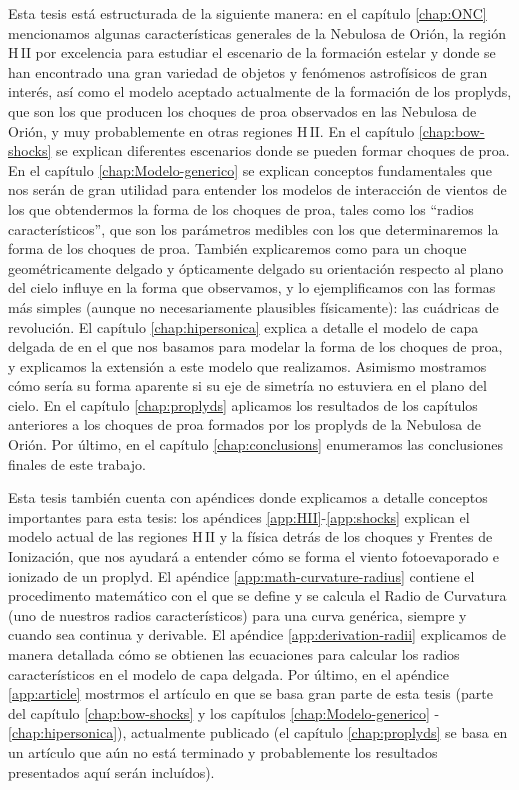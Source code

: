 \documentclass[11pt, twoside]{book}
\newcommand\Ion[2]{\ensuremath{\mathrm{#1\,\scriptstyle #2}}} %
\begin{document}
Esta tesis está estructurada de la siguiente manera: en el capítulo \ref{chap:ONC} mencionamos algunas características generales de la Nebulosa de Orión, la región \Ion{H}{II} por excelencia para estudiar el escenario de la formación estelar y donde se han encontrado una gran variedad de objetos y fenómenos astrofísicos de gran interés, así como el modelo aceptado actualmente de la formación de los proplyds, que son los que producen los choques de proa observados en las Nebulosa de Orión, y muy probablemente en otras regiones \Ion{H}{II}. En el capítulo \ref{chap:bow-shocks} se explican diferentes escenarios donde se pueden formar choques de proa. En el capítulo \ref{chap:Modelo-generico} se explican conceptos fundamentales que nos serán de gran utilidad para entender los modelos de interacción de vientos de los que obtendermos la forma de los choques de proa, tales como los ``radios característicos'', que son los parámetros medibles con los que determinaremos la forma de los choques de proa. También explicaremos como para un choque geométricamente delgado y ópticamente delgado su orientación respecto al plano del cielo influye en la forma que observamos, y lo ejemplificamos con las formas más simples (aunque no necesariamente plausibles físicamente): las cuádricas de revolución. El capítulo \ref{chap:hipersonica} explica a detalle el modelo de capa delgada de \citet{Canto:1996} en el que nos basamos para modelar la forma de los choques de proa, y explicamos la extensión a este modelo que realizamos. Asimismo mostramos cómo sería su forma aparente si su eje de simetría no estuviera en el plano del cielo. En el capítulo \ref{chap:proplyds} aplicamos los resultados de los capítulos anteriores a los choques de proa formados por los proplyds de la Nebulosa de Orión. Por último, en el capítulo \ref{chap:conclusions} enumeramos las conclusiones finales de este trabajo.

Esta tesis también cuenta con apéndices donde explicamos a detalle conceptos importantes para esta tesis: los apéndices \ref{app:HII}-\ref{app:shocks} explican el modelo actual de las regiones \Ion{H}{II} y la física detrás de los choques y Frentes de Ionización, que nos ayudará a entender cómo se forma el viento fotoevaporado e ionizado de un proplyd. El apéndice \ref{app:math-curvature-radius} contiene el procedimento matemático con el que se define y se calcula el Radio de Curvatura (uno de nuestros radios característicos) para una curva genérica, siempre y cuando sea continua y derivable. El apéndice \ref{app:derivation-radii} explicamos de manera detallada cómo se obtienen las ecuaciones para calcular los radios característicos en el modelo de capa delgada. Por último, en el apéndice \ref{app:article} mostrmos el artículo en que se basa gran parte de esta tesis (parte del capítulo \ref{chap:bow-shocks} y los capítulos \ref{chap:Modelo-generico} - \ref{chap:hipersonica}), actualmente publicado (el capítulo \ref{chap:proplyds} se basa en un artículo que aún no está terminado y probablemente los resultados presentados aquí serán incluídos).
\end{document}
